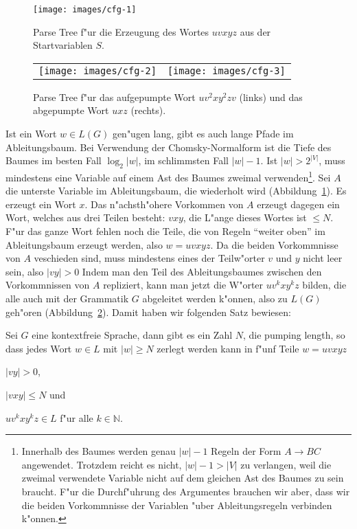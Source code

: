 \begin{figure}
\begin{center}
\texttt{[image: images/cfg-1]}
\end{center}
\caption{Parse Tree f"ur die Erzeugung des Wortes $uvxyz$ aus der
Startvariablen $S$.\label{cfg-tree-1}}
\end{figure}
\begin{figure}
\begin{center}
\begin{tabular}{cc}
\texttt{[image: images/cfg-2]}&%
\texttt{[image: images/cfg-3]}\\
\end{tabular}
\end{center}
\caption{Parse Tree f"ur das aufgepumpte Wort $uv^2xy^2zv$ (links) und das
abgepumpte Wort $uxz$ (rechts).\label{cfg-tree-2}}
\end{figure}

Ist ein Wort $w\in L(G)$ gen"ugen lang, gibt es auch lange Pfade im
Ableitungsbaum. Bei Verwendung der Chomsky-Normalform ist die 
Tiefe des Baumes im besten Fall $\log_2 |w|$, im schlimmsten Fall $|w|-1$.
Ist $|w|>2^{|V|}$, muss mindestens eine
Variable auf einem Ast des Baumes zweimal verwenden\footnote{
Innerhalb des Baumes werden genau $|w|-1$ Regeln der
Form $A\to BC$ angewendet.
Trotzdem reicht es nicht, $|w|-1>|V|$ zu verlangen, weil die
zweimal verwendete Variable nicht auf dem gleichen Ast des
Baumes zu sein braucht. F"ur die Durchf"uhrung des Argumentes
brauchen wir aber, dass wir die beiden Vorkommnisse der Variablen
"uber Ableitungsregeln verbinden k"onnen.}.
Sei $A$ die unterste Variable im Ableitungsbaum, die wiederholt
wird (Abbildung~\ref{cfg-tree-1}).
Es erzeugt ein Wort $x$. Das n"achsth"ohere Vorkommen von $A$
erzeugt dagegen ein Wort, welches aus drei Teilen besteht:
$vxy$, die L"ange dieses Wortes ist $\le N$. F"ur das ganze Wort fehlen
noch die Teile, die von Regeln ``weiter oben'' im Ableitungsbaum
erzeugt werden, also $w=uvxyz$.
Da die beiden Vorkommnisse von $A$ veschieden sind, muss mindestens
eines der Teilw"orter $v$ und $y$ nicht leer sein, also $|vy|>0$
Indem man den Teil des Ableitungsbaumes
zwischen den Vorkommnissen von $A$ repliziert, kann man jetzt die
W"orter $uv^kxy^kz$ bilden, die alle auch mit der Grammatik $G$ 
abgeleitet werden k"onnen, also zu $L(G)$ geh"oren (Abbildung~\ref{cfg-tree-2}).
Damit haben wir folgenden Satz bewiesen:

\begin{satz}
Sei $G$ eine kontextfreie Sprache, dann gibt es ein Zahl $N$, die pumping
length, so dass jedes Wort $w\in L$ mit $|w|\ge N$ zerlegt werden
kann in f"unf Teile $w=uvxyz$
\begin{compactenum}
\item
$|vy|>0$,
\item
$|vxy|\le N$ und
\item
$uv^kxy^kz\in L$ f"ur alle $k\in\mathbb N$.
\end{compactenum}
\end{satz}

